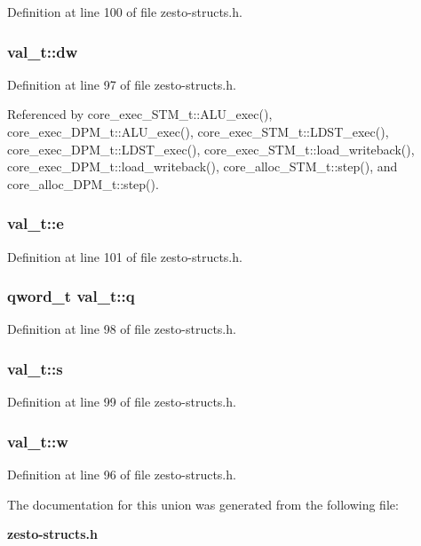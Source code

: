 Definition at line 100 of file zesto-structs.h.
\subsubsection[{dw}]{ {\bf val\_\-t::dw}}\label{unionval__t_0097b33ae33eaf111f07f341005c37ae}




Definition at line 97 of file zesto-structs.h.

Referenced by core\_\-exec\_\-STM\_\-t::ALU\_\-exec(), core\_\-exec\_\-DPM\_\-t::ALU\_\-exec(), core\_\-exec\_\-STM\_\-t::LDST\_\-exec(), core\_\-exec\_\-DPM\_\-t::LDST\_\-exec(), core\_\-exec\_\-STM\_\-t::load\_\-writeback(), core\_\-exec\_\-DPM\_\-t::load\_\-writeback(), core\_\-alloc\_\-STM\_\-t::step(), and core\_\-alloc\_\-DPM\_\-t::step().
\subsubsection[{e}]{ {\bf val\_\-t::e}}\label{unionval__t_54eda00fe0a8fb83b39b4ec5b6430748}




Definition at line 101 of file zesto-structs.h.
\subsubsection[{q}]{\setlength{\rightskip}{0pt plus 5cm}qword\_\-t {\bf val\_\-t::q}}\label{unionval__t_9d8b0ff15f0af5d6eadfad9aa066b469}




Definition at line 98 of file zesto-structs.h.
\subsubsection[{s}]{ {\bf val\_\-t::s}}\label{unionval__t_66b76bf071255a887c5aa2b7d85a673c}




Definition at line 99 of file zesto-structs.h.
\subsubsection[{w}]{ {\bf val\_\-t::w}}\label{unionval__t_c8e7eaf4e2b64c8ceb82716436713a89}




Definition at line 96 of file zesto-structs.h.

The documentation for this union was generated from the following file:\begin{CompactItemize}
\item 
{\bf zesto-structs.h}\end{CompactItemize}
